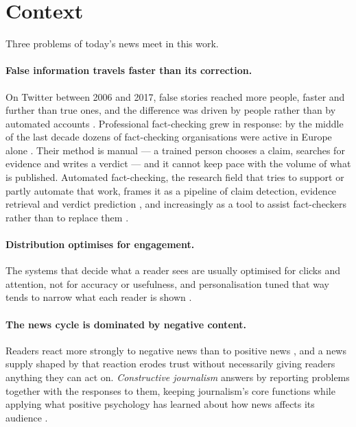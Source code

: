 
\section{Context}
\label{sec:context}

Three problems of today's news meet in this work.

\paragraph{False information travels faster than its correction.}
On Twitter between 2006 and 2017, false stories reached more people,
faster and further than true ones, and the difference was driven by
people rather than by automated accounts \cite{vosoughi2018spread}.
Professional fact-checking grew in response: by the middle of the last
decade dozens of fact-checking organisations were active in Europe
alone \cite{graves2016rise}. Their method is manual --- a trained
person chooses a claim, searches for evidence and writes a verdict
--- and it cannot keep pace with the volume of what is published.
Automated fact-checking, the research field that tries to support or
partly automate that work, frames it as a pipeline of claim detection,
evidence retrieval and verdict prediction \cite{guo2022survey}, and
increasingly as a tool to assist fact-checkers rather than to replace
them \cite{nakov2021assisting}.

\paragraph{Distribution optimises for engagement.} The systems that
decide what a reader sees are usually optimised for clicks and
attention, not for accuracy or usefulness, and personalisation tuned
that way tends to narrow what each reader is shown
\cite{pariser2011filter,karimi2018news}.

\paragraph{The news cycle is dominated by negative content.} Readers
react more strongly to negative news than to positive news
\cite{soroka2015negativity}, and a news supply shaped by that reaction
erodes trust without necessarily giving readers anything they can act
on. \emph{Constructive journalism} answers by reporting problems
together with the responses to them, keeping journalism's core
functions while applying what positive psychology has learned about
how news affects its audience \cite{mcintyre2017constructive}.

